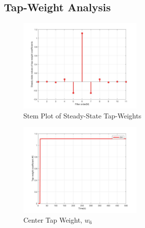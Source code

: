 \documentclass[journal]{IEEEtran}
\begin{document}
\subsection{Tap-Weight Analysis}
\begin{figure}[H]
  \centering
  \captionsetup{justification=centering}
  \includegraphics[width=0.55\textwidth, inner] {Plots/Project2_weights.jpg}
  \caption{Stem Plot of Steady-State Tap-Weights}
    \label{fig:weights}
\end{figure}

\begin{figure}[H]
  \centering
  \captionsetup{justification=centering}
  \includegraphics[width=0.55\textwidth, inner] {Plots/Project2_w6.jpg}
  \caption{Center Tap Weight, $w_6$}
    \label{fig:w6}
\end{figure}
\end{document}
